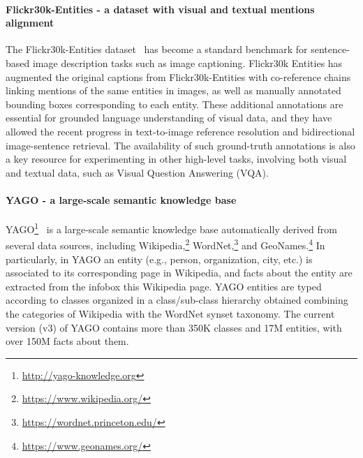\documentclass[11pt,a4paper]{article}
\begin{document}
\paragraph{Flickr30k-Entities - a dataset with visual and textual mentions
	alignment} The Flickr30k-Entities dataset~\cite{plummer2015flickr30k} has
become a standard benchmark for sentence-based image description tasks
such as image captioning. Flickr30k Entities has augmented the
original captions from Flickr30k-Entities with co-reference chains linking
mentions of the same entities in images, as well as manually annotated
bounding boxes corresponding to each entity. These additional
annotations are essential for grounded language understanding of
visual data, and they have allowed the recent progress in
text-to-image reference resolution and bidirectional image-sentence
retrieval. The availability of such ground-truth annotations is also a
key resource for experimenting in other high-level tasks, involving
both visual and textual data, such as Visual Question Answering (VQA).

\paragraph{YAGO - a large-scale semantic knowledge base}
YAGO\footnote{\url{http://yago-knowledge.org}}~\cite{yago} is a
large-scale semantic knowledge base automatically derived from several
data sources, including
Wikipedia,\footnote{\url{https://www.wikipedia.org/}}
WordNet,\footnote{\url{https://wordnet.princeton.edu/}} and
GeoNames.\footnote{\url{https://www.geonames.org/}} In particularly,
in YAGO an entity (e.g., person, organization, city, etc.) is
associated to its corresponding page in Wikipedia, and facts about the entity are
extracted from the infobox this Wikipedia page.
YAGO entities are typed according to classes organized in a class/sub-class
hierarchy obtained combining the categories of Wikipedia with the
WordNet synset taxonomy. The current version (v3) of YAGO contains
more than 350K classes and 17M entities, with over 150M facts about
them.
\end{document}
